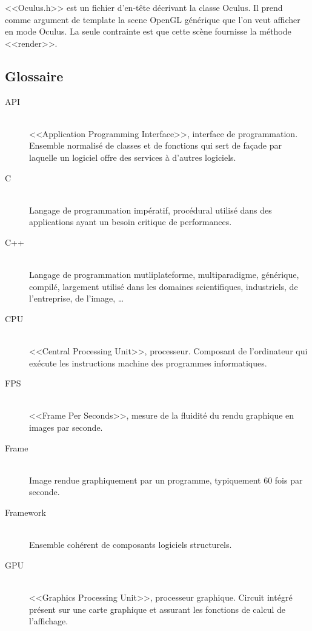 \documentclass[a4paper,french,12pt]{article}
\begin{document}
	\FloatBarrier
	<<Oculus.h>> est un fichier d'en-tête décrivant la classe Oculus. Il prend comme argument de template la scene
	OpenGL générique que l'on veut afficher en mode Oculus. La seule contrainte est que cette scène fournisse 
	la méthode <<render>>.
	
	\FloatBarrier
		
	\subsection{Glossaire}
		\begin{description}
		
		\item [API]~\\
		    <<Application Programming Interface>>, interface de programmation. Ensemble normalisé de classes et de 
		    fonctions qui sert de façade par laquelle un logiciel offre des services à d'autres logiciels.
		
		\item [C] ~\\
		    Langage de programmation impératif, procédural utilisé dans des applications ayant un besoin critique
		    de performances.
		    
		\item [C++] ~\\
		    Langage de programmation mutliplateforme, multiparadigme, générique, compilé, largement utilisé
		    dans les domaines scientifiques, industriels, de l'entreprise, de l'image, \ldots
		
		\item [CPU]~\\
		    <<Central Processing Unit>>, processeur. 
		    Composant de l'ordinateur qui exécute les instructions machine des programmes informatiques.
		
		\item [FPS] ~\\
		      <<Frame Per Seconds>>, mesure de la fluidité du rendu graphique en images par seconde.
		
		\item [Frame]~\\
		    Image rendue graphiquement par un programme, typiquement 60 fois par seconde.
		    
		\item [Framework]~\\
		    Ensemble cohérent de composants logiciels structurels.

		\item [GPU]~\\
		    <<Graphics Processing Unit>>, processeur graphique.
		    Circuit intégré présent sur une carte graphique et assurant les fonctions de calcul de l'affichage.
		

\end{description}
\end{document}
